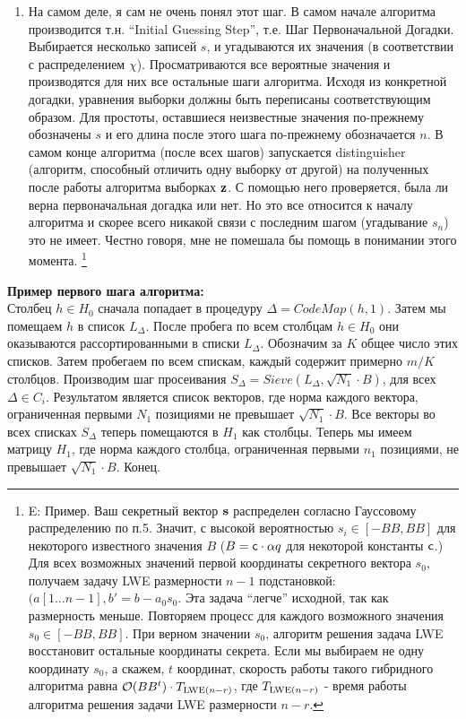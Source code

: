 \documentclass[a4paper,11pt]{article}
\begin{document}
\begin{enumerate}
\item 	На самом деле, я сам не очень понял этот шаг. В самом начале алгоритма производится т.н. “Initial Guessing Step”, т.е. Шаг Первоначальной Догадки. Выбирается несколько записей $s$, и угадываются их значения (в соответствии с распределением $\chi$). Просматриваются все вероятные значения и производятся для них все остальные шаги алгоритма. Исходя из конкретной догадки, уравнения выборки должны быть переписаны соответствующим образом. Для простоты, оставшиеся неизвестные значения по-прежнему обозначены $s$ и его длина после этого шага по-прежнему обозначается $n$. В самом конце алгоритма (после всех шагов) запускается distinguisher (алгоритм, способный отличить одну выборку от другой) на полученных после работы алгоритма выборках $\mathbf{z}$. С помощью него проверяется, была ли верна первоначальная догадка или нет. Но это все относится к началу алгоритма и скорее всего никакой связи с последним шагом (угадывание $s_n$) это не имеет. Честно говоря, мне не помешала бы помощь в понимании этого момента. \footnote{E: Пример. Ваш секретный вектор $\mathbf{s}$ распределен согласно Гауссовому распределению по п.5. Значит, с высокой вероятностью $s_i \in [-BB,BB]$ для некоторого известного значения $B$ ($B = \mathsf{c} \cdot \alpha q$ для некоторой константы $\mathsf{c}$.)  Для всех возможных значений первой координаты секретного вектора $s_0$, получаем задачу LWE  размерности $n-1$ подстановкой: $(a[1\ldots n-1], b' = b - a_0 s_0 $. Эта задача ``легче'' исходной, так как размерность меньше. Повторяем процесс для каждого возможного значения $s_0 \in [-BB,BB]$. При верном значении $s_0$, алгоритм решения задача LWE восстановит остальные координаты секрета.
Если мы выбираем не одну координату $s_0$, а скажем, $t$ координат, скорость работы такого гибридного алгоритма равна $\mathcal{O}(BB^t) \cdot T_{\textup{LWE}(n-r)}$, где $T_{\textup{LWE}(n-r)}$ - время работы алгоритма решения задачи LWE размерности $n-r$.
}
\end{enumerate}

\textbf{Пример первого шага алгоритма:}\\
Столбец $h \in H_0$ сначала попадает в процедуру $\Delta=CodeMap(h,1)$. Затем мы помещаем $h$ в список $L_{\Delta}$. После пробега по всем столбцам $h \in H_0$ они оказываются рассортированными в списки $L_{\Delta}$. Обозначим за $K$ общее число этих списков. Затем пробегаем по всем спискам, каждый содержит примерно $m/K$ столбцов. Производим шаг просеивания  $S_{\Delta} = Sieve(L_{\Delta}, \sqrt{N_1}\cdot B)$, для всех $\Delta \in C_i$. Результатом является список векторов, где норма каждого вектора, ограниченная первыми $N_1$ позициями не превышает $\sqrt{N_1}\cdot B$. Все векторы во всех списках $S_{\Delta}$ теперь помещаются в $H_1$ как столбцы. Теперь мы имеем матрицу $H_1$, где норма каждого столбца, ограниченная первыми $n_1$ позициями, не превышает $\sqrt{N_1}\cdot B$. Конец.
\end{document}

